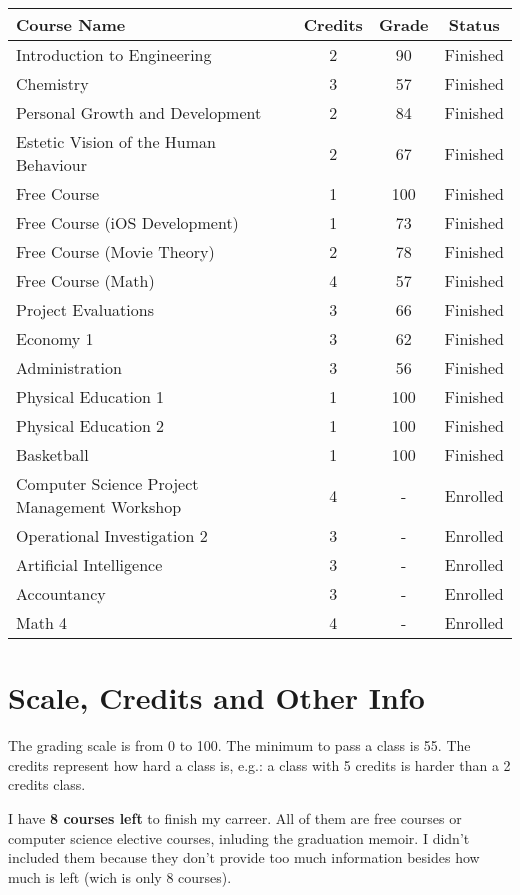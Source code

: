 \documentclass[12pt,letterpaper]{article}
\begin{document}
\begin{center}
    \begin{tabular}{ | l | c | c | c |}
    \hline
    \bf Course Name & \bf Credits & \bf Grade & \bf Status \\ \hline
    
    \hline
	Introduction to Engineering & 2 & 90 & Finished \\ \hline
	Chemistry & 3 & 57 & Finished \\ \hline
	Personal Growth and Development & 2 & 84 & Finished \\ \hline
	Estetic Vision of the Human Behaviour & 2 & 67 & Finished \\ \hline
	Free Course & 1 & 100 & Finished \\ \hline
	Free Course (iOS Development) & 1 & 73 & Finished \\ \hline
	Free Course (Movie Theory) & 2 & 78 & Finished \\ \hline
	Free Course (Math) & 4 & 57 & Finished \\ \hline
	Project Evaluations & 3 & 66 & Finished \\ \hline
	Economy 1 & 3 & 62 & Finished \\ \hline
	Administration & 3 & 56 & Finished \\ \hline \hline

	Physical Education 1 & 1 & 100 & Finished \\ \hline
	Physical Education 2 & 1 & 100 & Finished \\ \hline
	Basketball & 1 & 100 & Finished \\ \hline \hline

	Computer Science Project Management Workshop & 4 & - & Enrolled \\ \hline
	Operational Investigation 2 & 3 & - & Enrolled \\ \hline
	Artificial Intelligence & 3 & - & Enrolled \\ \hline
	Accountancy & 3 & - & Enrolled \\ \hline
	Math 4 & 4 & - & Enrolled \\
    \hline
    \end{tabular}
\end{center}

\section{Scale, Credits and Other Info}
The grading scale is from 0 to 100. The minimum to pass a class is 55. The credits represent how hard a class is, e.g.: a class with 5 credits is harder than a 2 credits class.

I have \textbf{8 courses left} to finish my carreer. All of them are free courses or computer science elective courses, inluding the graduation memoir. I didn't included them because they don't provide too much information besides how much is left (wich is only 8 courses).
\end{document}
